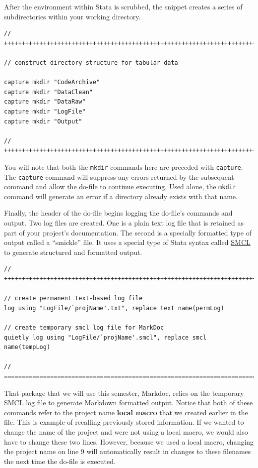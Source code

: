 \documentclass[]{book}
\begin{document}
After the environment within Stata is scrubbed, the snippet creates a
series of subdirectories within your working directory.

\begin{verbatim}
// ++++++++++++++++++++++++++++++++++++++++++++++++++++++++++++++++++++++++++

// construct directory structure for tabular data

capture mkdir "CodeArchive"
capture mkdir "DataClean"
capture mkdir "DataRaw"
capture mkdir "LogFile"
capture mkdir "Output"

// ++++++++++++++++++++++++++++++++++++++++++++++++++++++++++++++++++++++++++
\end{verbatim}

You will note that both the \texttt{mkdir} commands here are preceded
with \texttt{capture}. The \texttt{capture} command will suppress any
errors returned by the subsequent command and allow the do-file to
continue executing. Used alone, the \texttt{mkdir} command will generate
an error if a directory already exists with that name.

Finally, the header of the do-file begins logging the do-file's commands
and output. Two log files are created. One is a plain text log file that
is retained as part of your project's documentation. The second is a
specially formatted type of output called a ``smickle'' file. It uses a
special type of Stata syntax called
\href{http://www.stata.com/manuals14/psmcl.pdf}{SMCL} to generate
structured and formatted output.

\begin{verbatim}
// ++++++++++++++++++++++++++++++++++++++++++++++++++++++++++++++++++++++++++

// create permanent text-based log file
log using "LogFile/`projName'.txt", replace text name(permLog)

// create temporary smcl log file for MarkDoc
quietly log using "LogFile/`projName'.smcl", replace smcl name(tempLog)

// ==========================================================================
\end{verbatim}

That package that we will use this semester, Markdoc, relies on the
temporary SMCL log file to generate Markdown formatted output. Notice
that both of these commands refer to the project name \textbf{local
macro} that we created earlier in the file. This is example of recalling
previously stored information. If we wanted to change the name of the
project and were not using a local macro, we would also have to change
these two lines. However, because we used a local macro, changing the
project name on line 9 will automatically result in changes to these
filenames the next time the do-file is executed.
\end{document}
